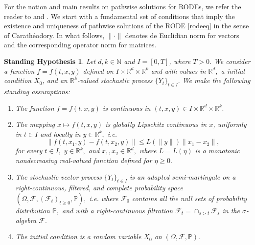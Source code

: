 \documentclass[reqno,12pt]{amsart}
\theoremstyle{plain} %
\newtheorem{stdhyp}{Standing Hypothesis}[section]
\theoremstyle{definition} %
\begin{document}
For the notion and main results on pathwise solutions for RODEs, we refer the reader to \cite[Section 2.1]{HanKloeden2017} and \cite[Section 3.3]{NeckelRupp2013}. We start with a fundamental set of conditions that imply the existence and uniqueness of pathwise solutions of the RODE \cref{rodeeq} in the sense of Carath\'eodory. In what follows, $\|\cdot\|$ denotes de Euclidian norm for vectors and the corresponding operator norm for matrices.
\begin{stdhyp}
    \label{standinghypotheses1}
    Let $d, k\in \mathbb{N}$ and $I=[0, T]$, where $T > 0.$
    We consider a function $f=f(t, x, y)$ defined on $I\times \mathbb{R}^d\times\mathbb{R}^k$ and with values in $\mathbb{R}^d,$ a initial condition $X_0$, and an $\mathbb{R}^k$-valued stochastic process {$\{Y_t\}_{t\in I}.$} We make the following standing assumptions:
    \begin{enumerate}
        \item \label{standinghypothesisfcontinuous} The function $f = f(t, x, y)$ is continuous in $(t, x, y)\in I \times \mathbb{R}^d \times \mathbb{R}^k.$
        \item \label{standinghypothesisLipschitzbound} The mapping $x \mapsto f(t, x, y)$ is globally Lipschitz continuous in $x$, uniformly in $t\in I$ and locally in $y\in \mathbb{R}^k,$ i.e.
        \begin{equation}
            \label{Ltassumptionbasic}
            \|f(t, x_1, y) - f(t, x_2, y)\| \leq L(\|y\|) \|x_1 - x_2\|,
        \end{equation}
        for every $t\in I,$ $y\in\mathbb{R}^k,$ and $x_1, x_2 \in\mathbb{R}^d,$ where $L=L(\eta)$ is a monotonic nondecreasing real-valued function defined for $\eta \geq 0.$
        \item \label{standinghypothesisnoise} The stochastic vector process $\{Y_t\}_{t\in I}$ is an adapted semi-martingale on a right-continuous, filtered, and complete probability space $(\Omega, \mathcal{F}, (\mathcal{F}_t)_{t\geq 0}, \mathbb{P}),$ i.e. where $\mathcal{F}_0$ contains all the null sets of probability distribution $\mathbb{P},$ and with a right-continuous filtration $\mathcal{F}_t = \cap_{s > t} \mathcal{F}_s$ in the $\sigma$-algebra $\mathcal{F}.$
        \item \label{standinghypothesisic} The initial condition is a random variable $X_0$ on $(\Omega, \mathcal{F}, \mathbb{P}).$
    \end{enumerate}
\end{stdhyp}
\end{document}
